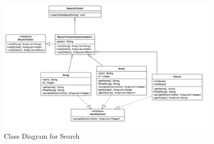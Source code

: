 \documentclass[12pt]{article}
\begin{document}
\begin{figure}[H]
	\centering
	\includegraphics[scale=0.25]{Search.png}
	\caption{Class Diagram for Search}
	\label{fig:classDiagSearch}
\end{figure}
\end{document}
